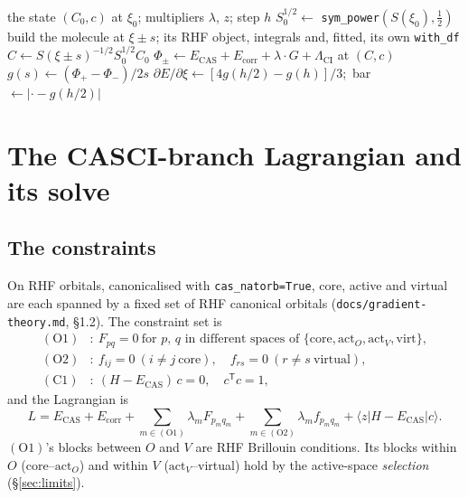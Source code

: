 \documentclass[11pt]{article}
\newcommand{\code}[1]{\texttt{#1}}
\newcommand{\Ecas}{E_{\mathrm{CAS}}}
\newcommand{\Ecorr}{E_{\mathrm{corr}}}
\newcommand{\cons}[1]{\ensuremath{(\mathrm{#1})}}
\begin{document}
\begin{algorithm}[htbp]
\caption{\code{Gradients.kernel}: the frozen-path derivative}
\label{alg:kernel}
\begin{algorithmic}[1]
\Require the state $(C_0, c)$ at $\xi_0$; multipliers $\lambda$, $z$; step $h$
\State $S_0^{1/2} \gets$ \code{sym\_power}$(S(\xi_0), \tfrac12)$
 
    \For{$\pm$}
      \State build the molecule at $\xi \pm s$; its RHF object, integrals and, fitted, its own \code{with\_df}
      \State $C \gets S(\xi\pm s)^{-1/2} S_0^{1/2} C_0$ 
      \State $\Phi_\pm \gets \Ecas + \Ecorr + \lambda\cdot G + \Lambda_{\mathrm{CI}}$ at $(C, c)$ 
    \EndFor
    \State $g(s) \gets (\Phi_+ - \Phi_-)/2s$
  \EndFor
  \State $\partial E/\partial\xi \gets [4g(h/2) - g(h)]/3$;\ bar $\gets |{\cdot} - g(h/2)|$
\EndFor
\end{algorithmic}
\end{algorithm}

\section{The CASCI-branch Lagrangian and its solve}
\label{sec:casci}

\subsection{The constraints}
On RHF orbitals, canonicalised with \code{cas\_natorb=True}, core, active and
virtual are each spanned by a fixed set of RHF canonical orbitals
(\code{docs/gradient-theory.md}, \S1.2). The constraint set is
\begin{align}
  \cons{O1}&:\ F_{pq} = 0\ \text{for $p$, $q$ in different spaces of
     $\{\text{core},\mathrm{act}_O,\mathrm{act}_V,\text{virt}\}$},\\
  \cons{O2}&:\ f_{ij} = 0\ (i\ne j\ \text{core}),\quad f_{rs} = 0\ (r\ne s\
     \text{virtual}),\\
  \cons{C1}&:\ (H - \Ecas)\,c = 0,\quad c^{\mathsf T}c = 1,
\end{align}
and the Lagrangian is
\begin{equation}
  L = \Ecas + \Ecorr + \sum_{m\in\cons{O1}} \lambda_m F_{p_mq_m}
    + \sum_{m\in\cons{O2}} \lambda_m f_{p_mq_m}
    + \langle z|H - \Ecas|c\rangle.
  \label{eq:Lcasci}
\end{equation}
\cons{O1}'s blocks between $O$ and $V$ are RHF Brillouin conditions. Its blocks
within $O$ (core--$\mathrm{act}_O$) and within $V$ ($\mathrm{act}_V$--virtual)
hold by the active-space \emph{selection} (\S\ref{sec:limits}).
\end{document}
